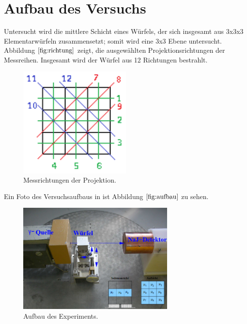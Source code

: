 \section{Aufbau des Versuchs}

Untersucht wird die mittlere Schicht eines Würfels, der sich insgesamt aus 3x3x3 Elementarwürfeln zusammensetzt; somit wird eine 3x3 Ebene untersucht.
Abbildung $\ref{fig:richtung}$ zeigt, die ausgewählten Projektionsrichtungen der Messreihen.
Insgesamt wird der Würfel aus 12 Richtungen bestrahlt.

\begin{figure}[H]
  \centering
  \includegraphics[width=0.5\textwidth]{Bilder/richtung.png}
  \caption{Messrichtungen der Projektion.}
  \label{fig:richtung}
\end{figure}
Ein Foto des Versuchsaufbaus in ist Abbildung $\ref{fig:aufbau}$ zu sehen.
\begin{figure}[H]
  \centering
  \includegraphics[width=0.7\textwidth]{Bilder/aufbau.png}
  \caption{Aufbau des Experiments.\cite{anleitung}}
  \label{fig:aufbau}
\end{figure}

